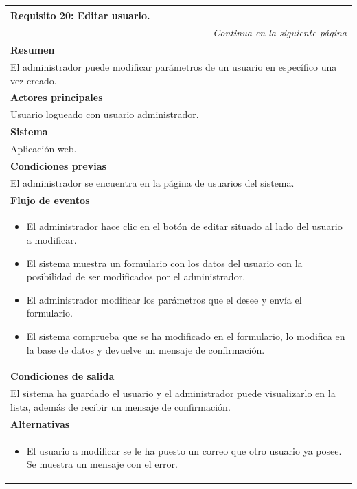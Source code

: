 \begin{longtable}{|p{}|}
\hline
 \rowcolor[gray]{.5}
 \color{white}\textbf{Requisito 20: Editar usuario.} \\
\hline
\endfirsthead
\endhead
\hline \multicolumn{1}{r}{\textit{Continua en la siguiente página}} \\
\endfoot
\endlastfoot
    \rowcolor[gray]{.9}
     \textbf{Resumen} \\
     \hline
     El administrador puede modificar parámetros de un usuario en específico una vez creado. \\
     \hline
     \rowcolor[gray]{.9}
     \textbf{Actores principales} \\
     \hline
     Usuario logueado con usuario administrador. \\
     \hline
     \rowcolor[gray]{.9}
     \textbf{Sistema} \\
     \hline
     Aplicación web. \\
     \hline
     \rowcolor[gray]{.9}
     \textbf{Condiciones previas} \\
     \hline
     El administrador se encuentra en la página de usuarios del sistema. \\
     \hline
     \rowcolor[gray]{.9}
     \textbf{Flujo de eventos}  \\
     \hline
      \begin{itemize}
         \item El administrador hace clic en el botón de editar situado al lado del usuario a modificar.
         \item El sistema muestra un formulario con los datos del usuario con la posibilidad de ser modificados por el administrador.
         \item El administrador modificar los parámetros que el desee y envía el formulario.
         \item El sistema comprueba que se ha modificado en el formulario, lo modifica en la base de datos y devuelve un mensaje de confirmación.
     \end{itemize} \\
     \hline
     \rowcolor[gray]{.9}
     \textbf{Condiciones de salida} \\
     \hline
     El sistema ha guardado el usuario y el administrador puede visualizarlo en la lista, además de recibir un mensaje de confirmación. \\
     \hline
     \rowcolor[gray]{.9}
     \textbf{Alternativas}  \\
     \hline
      \begin{itemize}
         \item El usuario a modificar se le ha puesto un correo que otro usuario ya posee. Se muestra un mensaje con el error.
     \end{itemize} \\
     \hline
\end{longtable}

